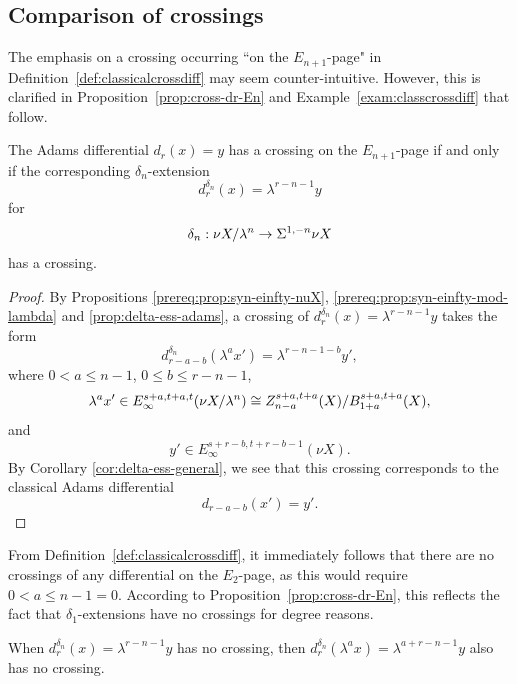 \subsection{Comparison of crossings}

The emphasis on a crossing occurring ``on the $E_{n+1}$-page" in Definition~\ref{def:classicalcrossdiff} may seem counter-intuitive. However, this is clarified in Proposition~\ref{prop:cross-dr-En} and Example~\ref{exam:classcrossdiff} that follow.

\begin{proposition}\label{prop:cross-dr-En}
    The Adams differential $d_r(x)=y$ has a crossing on the $E_{n+1}$-page if and only if the corresponding $\delta_n$-extension
    $$d^{\delta_n}_r(x)=\lambda^{r-n-1}y$$
    for
    $$\delta_{n}:\nu X/\lambda^{n}\to \Sigma^{1,-n}\nu X$$
    has a crossing.
\end{proposition}
\begin{proof}
    By Propositions \ref{prereq:prop:syn-einfty-nuX}, \ref{prereq:prop:syn-einfty-mod-lambda} and \ref{prop:delta-ess-adams}, a crossing of $d^{\delta_n}_r(x)=\lambda^{r-n-1}y$ takes the form
    $$d^{\delta_n}_{r-a-b}(\lambda^a x')=\lambda^{r-n-1-b}y',$$
    where $0<a\le n-1$, $0\le b\le r-n-1$, 
    $$\lambda^a x'\in E_\infty^{s+a,t+a,t}(\nu X/\lambda^n)\cong Z_{n-a}^{s+a,t+a}(X)/B_{1+a}^{s+a,t+a}(X),$$
    and
    $$y'\in E_\infty^{s+r-b, t+r-b-1}(\nu X).$$
    By Corollary \ref{cor:delta-ess-general}, we see that this crossing corresponds to the classical Adams differential
    $$d_{r-a-b}(x')=y'.$$
\end{proof}

\begin{remark} \label{nocrossE2}
    From Definition~\ref{def:classicalcrossdiff}, it immediately follows that there are no crossings of any differential on the $E_2$-page, as this would require $0< a \le n-1 = 0$. According to Proposition~\ref{prop:cross-dr-En}, this reflects the fact that $\delta_1$-extensions have no crossings for degree reasons.
\end{remark}

\begin{remark}
    When $d_r^{\delta_n}(x) = \lambda^{r-n-1}y$ has no crossing, then
    $d_r^{\delta_n}(\lambda^a x) = \lambda^{a+r-n-1}y$ also has no crossing.
\end{remark}

